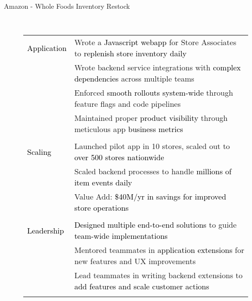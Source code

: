 \documentclass[11pt]{article}
\begin{document}
\begin{description}
\begin{description}
                \item[Amazon - Whole Foods Inventory Restock] \hfill \\
                \textcolor{gray}{
                    \begin{tabular}{l|l}
                        \\[-1.0mm]
                        \textcolor{black}{Application}
                            & Wrote a \textcolor{black}{Javascript webapp} for Store Associates to \textcolor{black}{replenish store inventory daily}\\
                            & Wrote backend service integrations with \textcolor{black}{complex dependencies} across multiple teams\\
                            & Enforced \textcolor{black}{smooth rollouts system-wide} through feature flags and code pipelines \\
                            & Maintained proper \textcolor{black}{product visibility} through meticulous app \textcolor{black}{business metrics} \\
                        \\[-1.7mm]
                        \textcolor{black}{Scaling}
                            & Launched pilot app in 10 stores, scaled out to \textcolor{black}{over 500 stores nationwide}\\
                            & Scaled backend processes to handle \textcolor{black}{millions of item events daily}\\
                            & Value Add: \textcolor{black}{\$40M/yr in savings for improved store operations}\\
                        \\[-1.7mm]
                        \textcolor{black}{Leadership}
                            & \textcolor{black}{Designed multiple end-to-end solutions} to guide \textcolor{black}{team-wide implementations}\\
                            & Mentored teammates in \textcolor{black}{application extensions} for new features and UX improvements\\
                            & Lead teammates in writing backend extensions to \textcolor{black}{add features and scale customer actions}\\
                        \\[-1.0mm]
                    \end{tabular}
                }


\end{description}
\end{description}
\end{document}
